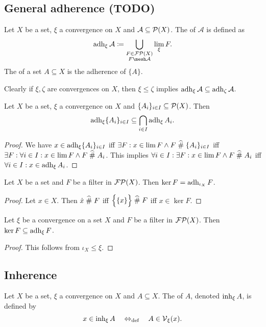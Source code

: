 \subsection{General adherence (TODO)}
\begin{definition}
Let $X$ be a set, $\xi$ a convergence on $X$ and $\mathcal{A} \subseteq \operatorname{\mathcal{P}}(X)$. The  of $\mathcal{A}$ is defined as
\[ \adh_\xi\mathcal{A} \defeq \bigcup_{\substack{F \in \powerfilters(X) \\ F \mesh \mathcal{A}}} \lim_\xi F. \]
The  of a set $A\subseteq X$ is the adherence of $\{A\}$.
\end{definition}
Clearly if $\xi,\zeta$ are convergences on $X$, then $\xi \leq \zeta$ implies $\operatorname{adh}_\xi\mathcal{A} \subseteq \operatorname{adh}_\zeta\mathcal{A}$.

\begin{lemma}
Let $X$ be a set, $\xi$ a convergence on $X$ and $\{A_i\}_{i\in I} \subseteq \operatorname{\mathcal{P}}(X)$. Then
\[ \operatorname{adh}_\xi \{A_i\}_{i\in I} \subseteq \bigcap_{i\in I}\operatorname{adh}_\xi A_i. \]
\end{lemma}
\begin{proof}
We have $x\in \operatorname{adh}_\xi \{A_i\}_{i\in I}$ iff $\exists F: x\in \lim F \land F\mathrel{\widehat{\#}} \{A_i\}_{i\in I}$ iff $\exists F: \forall i\in I: x\in \lim F \land F\mathrel{\widehat{\#}} A_i$. This implies $\forall i\in I: \exists F: x\in \lim F \land F\mathrel{\widehat{\#}} A_i$ iff $\forall i\in I: x\in \operatorname{adh}_\xi A_i$.
\end{proof}



\begin{lemma}
Let $X$ be a set and $F$ be a filter in $\operatorname{\mathcal{FP}}(X)$. Then $\ker F = \operatorname{adh}_{\iota_X} F$.
\end{lemma}
\begin{proof}
Let $x\in X$. Then $\dot{x} \mathrel{\widehat{\#}} F$ iff $\Big\{\{x\}\Big\} \mathrel{\widehat{\#}} F$ iff $x\in \ker F$.
\end{proof}
\begin{corollary}
Let $\xi$ be a convergence on a set $X$ and $F$ be a filter in $\operatorname{\mathcal{FP}}(X)$. Then $\ker F \subseteq \operatorname{adh}_\xi F$.
\end{corollary}
\begin{proof}
This follows from $\iota_X \leq \xi$.
\end{proof}

\subsection{Inherence}
\begin{definition}
Let $X$ be a set, $\xi$ a convergence on $X$ and $A \subseteq X$. The  of $A$, denoted $\operatorname{inh}_\xi A$, is defined by
\[ x\in \operatorname{inh}_\xi A \quad\Leftrightarrow_{\text{def}}\quad A\in \operatorname{\mathcal{V}}_\xi(x). \]
\end{definition}

